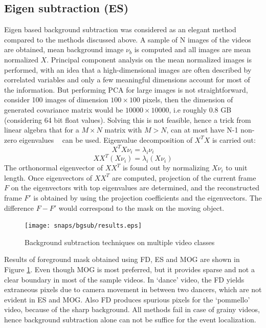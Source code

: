 \subsection{Eigen subtraction (ES)}
Eigen based background subtraction was considered as an elegant method compared to the methods discussed above.  A sample of N images of the videos are obtained, mean background image $\nu_b$ is computed and all images are mean normalized  $X$.  Principal component analysis on the mean normalized images is performed, with an idea that a high-dimensional images are often described by correlated variables and only a few meaningful dimensions account for most of the information.  But performing PCA for large images is not straightforward, consider 100 images of dimension $100 \times 100$ pixels, then the dimension of generated covariance matrix would be $10000 \times 10000$, i.e roughly 0.8 GB (considering 64 bit float values). Solving this is not feasible, hence a trick from linear algebra that for a $M  \times N$ matrix with $M>N$, can at most have N-1 non-zero eigenvalues ~\cite{Duda01} can be used. Eigenvalue decomposition of $X^TX$ is carried out:
$$X^TX\nu_i=\lambda_i\nu_i$$
$$XX^T(X\nu_i)=\lambda_i(X\nu_i)$$
The orthonormal eigenvector of $XX^T$ is found out by normalizing $X\nu_i$ to unit length.  Once eigenvectors of $XX^T$  are computed, projection of the current frame $F$ on the eigenvectors with top eigenvalues are determined, and the reconstructed frame $F'$ is obtained by using the projection coefficients and the eigenvectors.  The difference $F-F'$ would correspond to the mask on the moving object.

\begin{figure}[htpb]
   \begin{center}
	    \texttt{[image: snaps/bgsub/results.eps]}     
     \caption {Background subtraction techniques on multiple video classes}
   \label{fig:bgsub}
   \end{center}
 \end{figure}
\par Results of foreground mask obtained using FD, ES and MOG are shown in Figure \ref{fig:bgsub}. Even though MOG is most preferred, but it provides sparse and not a clear boundary in most of the sample videos.  In `dance' video, the FD yields extraneous pixels due to camera movement in between two dancers, which are not evident in ES and MOG.  Also FD produces spurious pixels for the `pommello' video, because of the sharp background.  All methods fail in case of grainy videos, hence background subtraction alone can not be suffice for the event localization.


